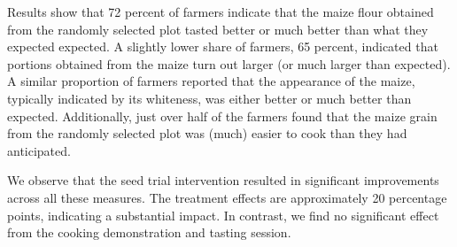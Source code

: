 \documentclass[english]{article}\usepackage[]{graphicx}\usepackage[]{xcolor}
\begin{document}
Results show that 72
percent of farmers indicate that the maize flour obtained from the
randomly selected plot tasted better or much better than what they
expected expected. A slightly lower share of farmers, 65
percent, indicated that portions obtained from the maize turn out
larger (or much larger than expected). A similar proportion of farmers
reported that the appearance of the maize, typically indicated by
its whiteness, was either better or much better than expected. Additionally,
just over half of the farmers found that the maize grain from the
randomly selected plot was (much) easier to cook than they had anticipated.

We observe that the seed trial intervention resulted in significant
improvements across all these measures. The treatment effects are
approximately 20 percentage points, indicating a substantial impact.
In contrast, we find no significant effect from the cooking demonstration
and tasting session.
\end{document}
